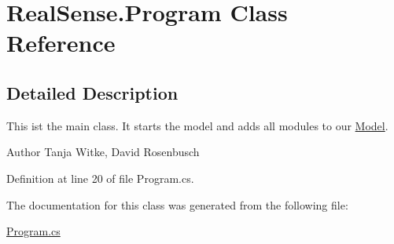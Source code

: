 \hypertarget{class_real_sense_1_1_program}{}\section{Real\+Sense.\+Program Class Reference}
\label{class_real_sense_1_1_program}


\subsection{Detailed Description}
This ist the main class. It starts the model and adds all modules to our \hyperlink{class_real_sense_1_1_model}{Model}.

\begin{DoxyAuthor}{Author}
Tanja Witke, David Rosenbusch 
\end{DoxyAuthor}


Definition at line 20 of file Program.\+cs.



The documentation for this class was generated from the following file\+:\begin{DoxyCompactItemize}
\item 
\hyperlink{_program_8cs}{Program.\+cs}\end{DoxyCompactItemize}
